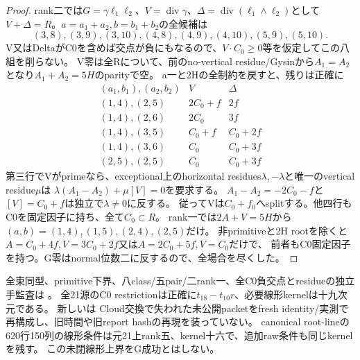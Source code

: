 \documentclass[a4paper,11pt]{ltjsarticle}
\theoremstyle{definition}
\begin{document}
\begin{proof}
rank二では$G=\gamma\ell_1\ell_2$、$V=\operatorname{div}\gamma$、$\Delta=\operatorname{div}(\ell_1\wedge\ell_2)$として
$V+\Delta=R$。$a=a_1+a_2,b=b_1+b_2$の全候補は
\[
 (3,8),(3,9),(3,10),(4,8),(4,9),(4,10),(5,9),(5,10).
\]
V又はDeltaがC0を含めば交点が負にもなるので、$V\cdot C_0\ge0$等を仮定してこの八組を削らない。
V零は全Rについて、前のno-vertical residue/Gysinから$A_1=A_2$となり$A_1+A_2=5H$のparityで空。
a一と2Hの全制約を戻すと、残りは正確に
\[
\begin{array}{c|c|c}
 (a_1,b_1),(a_2,b_2)&V&\Delta\\\hline
 (1,4),(2,5)&2C_0+f&2f\\
 (1,4),(2,6)&2C_0&3f\\
 (1,4),(3,5)&C_0+f&C_0+2f\\
 (1,4),(3,6)&C_0&C_0+3f\\
 (2,5),(2,5)&C_0&C_0+3f
\end{array}
\]
第三行でVがprimeなら、exceptional上のhorizontal residues$\lambda,-\lambda$と唯一のvertical residue$\mu$は
$\lambda(A_1-A_2)+\mu[V]=0$を要求する。
$A_1-A_2=-2C_0-f$と$[V]=C_0+f$は独立で$\lambda\ne0$に反する。
従ってVは$C_0+f_0$へsplitする。他四行もC0を固定因子に持ち、全て$C_0\subset R$。
rank一では$2A+V=5H$から$(a,b)=(1,4),(1,5),(2,4),(2,5)$だけ。
非primitiveと2H rootを除くと$A=C_0+4f,V=3C_0+2f$又は$A=2C_0+5f,V=C_0$だけで、
前者もC0固定因子を持つ。G零はnormal位数二に反するので、全場合を尽くした。
\end{proof}
全束同型、primitive下界、八class/五pair/二rank一、全C0負交点とresidueの独立手監査は
。
全21源のC0 restrictionは正確に$t_{18}-t_{10}r$、必要線形kernelは十九次元である。
新しいは
Cloud交換で失われた未公開packetをfresh identity/実測で再構成し、旧時間や旧report hashの再現を装っていない。
canonical root-lineの620行150列の線形条件は元21上rank五、kernel十六で、追加raw条件も同じkernelを残す。
この未閉線形上界をG成功とはしない。
\end{document}
